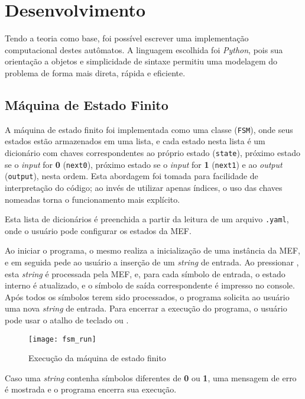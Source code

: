 \section{Desenvolvimento}

Tendo a teoria como base, foi possível escrever uma implementação computacional
destes autômatos. A linguagem escolhida foi \textit{Python}, pois sua
orientação a objetos e simplicidade de sintaxe permitiu uma modelagem do
problema de forma mais direta, rápida e eficiente.

\subsection{Máquina de Estado Finito}

A máquina de estado finito foi implementada como uma classe (\verb|FSM|), onde
seus estados estão armazenados em uma lista, e cada estado nesta lista é um
dicionário com chaves correspondentes ao próprio estado (\verb|state|),
próximo estado se o \textit{input} for \textbf{0} (\verb|next0|), próximo
estado se o \textit{input} for \textbf{1} (\verb|next1|) e ao \textit{output}
(\verb|output|), nesta ordem. Esta abordagem foi tomada para facilidade de
interpretação do código; ao invés de utilizar apenas índices, o uso das chaves
nomeadas torna o funcionamento mais explícito.

Esta lista de dicionários é preenchida a partir da leitura de um arquivo
\verb|.yaml|, onde o usuário pode configurar os estados da MEF.

Ao iniciar o programa, o mesmo realiza a inicialização de uma instância da MEF,
e em seguida pede ao usuário a inserção de um \textit{string} de entrada. Ao
pressionar \keys{\return}, esta \textit{string} é processada pela MEF, e, para
cada símbolo de entrada, o estado interno é atualizado, e o símbolo de saída
correspondente é impresso no console. Após todos os símbolos terem sido
processados, o programa solicita ao usuário uma nova \textit{string} de entrada.
Para encerrar a execução do programa, o usuário pode usar o atalho de teclado
 ou .

\begin{figure}[H]
    \centering
    \texttt{[image: fsm\_run]}
    \caption{Execução da máquina de estado finito}
    \label{fig:fsm_run}
\end{figure}

Caso uma \textit{string} contenha símbolos diferentes de \textbf{0} ou
\textbf{1}, uma mensagem de erro é mostrada e o programa encerra sua execução.

